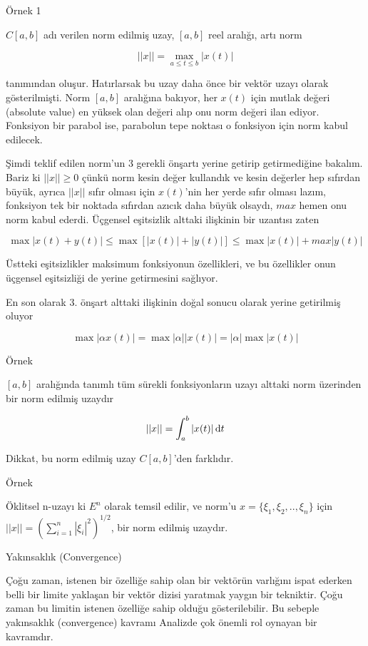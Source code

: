 \documentclass[12pt,fleqn]{article}\usepackage{../../common}
\begin{document}
Örnek 1

$C[a,b]$ adı verilen norm edilmiş uzay, $[a,b]$ reel aralığı, artı norm

$$ ||x|| = \max_{a \le t \le b} |x(t)| $$

tanımından oluşur. Hatırlarsak bu uzay daha önce bir vektör uzayı olarak
gösterilmişti. Norm $[a,b]$ aralığına bakıyor, her $x(t)$ için mutlak değeri
(absolute value) en yüksek olan değeri alıp onu norm değeri ilan
ediyor. Fonksiyon bir parabol ise, parabolun tepe noktası o fonksiyon için
norm kabul edilecek. 

Şimdi teklif edilen norm'un 3 gerekli önşartı yerine getirip getirmediğine
bakalım. Bariz ki $||x|| \ge 0$ çünkü norm kesin değer kullandık ve kesin
değerler hep sıfırdan büyük, ayrıca $||x||$ sıfır olması için $x(t)$'nin
her yerde sıfır olması lazım, fonksiyon tek bir noktada sıfırdan azıcık
daha büyük olsaydı, $max$ hemen onu norm kabul ederdi. Üçgensel eşitsizlik
alttaki ilişkinin bir uzantısı zaten

$$ 
\max |x(t) + y(t)| \le 
\max [|x(t)| + |y(t)|] \le
\max |x(t)| + max |y(t)|
$$

Üstteki eşitsizlikler maksimum fonksiyonun özellikleri, ve bu özellikler
onun üçgensel eşitsizliği de yerine getirmesini sağlıyor. 

En son olarak 3. önşart alttaki ilişkinin doğal sonucu olarak yerine
getirilmiş oluyor 

$$ \max |\alpha x(t)|  = \max |\alpha||x(t)| = |\alpha| \max |x(t)|  $$

Örnek

$[a,b]$ aralığında tanımlı tüm sürekli fonksiyonların uzayı alttaki norm
üzerinden bir norm edilmiş uzaydır

$$ ||x|| = \int _{ a}^{b} |x(t)| \,\mathrm{d} t $$

Dikkat, bu norm edilmiş uzay $C[a,b]$'den farklıdır. 

Örnek 

Öklitsel n-uzayı ki $E^n$ olarak temsil edilir, ve norm'u $x = \{ \xi_1,
\xi_2, .., \xi_n\}$ için $||x|| = (\sum _{ i=1}^{n} |\xi_i|^2)^{1/2}$, bir
norm edilmiş uzaydır.

Yakınsaklık (Convergence)

Çoğu zaman, istenen bir özelliğe sahip olan bir vektörün varlığını ispat
ederken belli bir limite yaklaşan bir vektör dizisi yaratmak yaygın bir
tekniktir. Çoğu zaman bu limitin istenen özelliğe sahip olduğu
gösterilebilir. Bu sebeple yakınsaklık (convergence) kavramı Analizde çok
önemli rol oynayan bir kavramdır.
\end{document}
